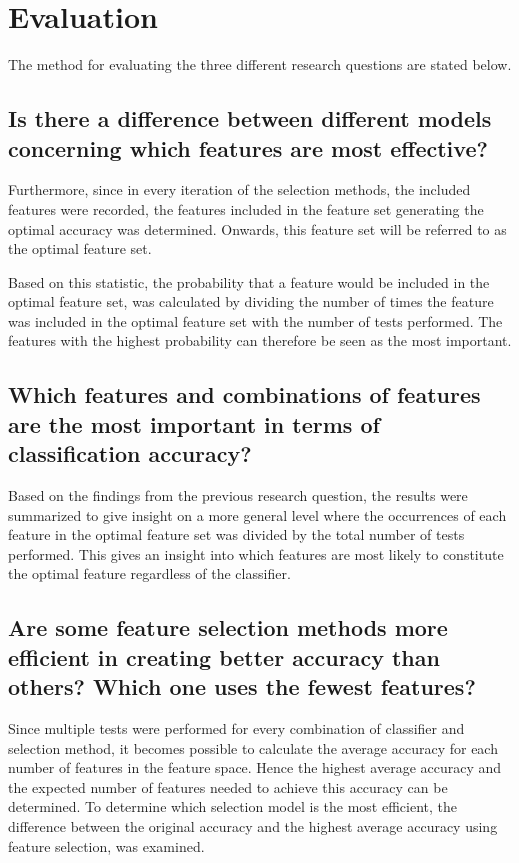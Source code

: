 \documentclass{kththesis}
\begin{document}
\section{Evaluation}

The method for evaluating the three different research questions are stated below.

\subsection{Is there a difference between different models concerning which features are most effective?}
Furthermore, since in every iteration of the selection methods, the included features were recorded, the features included in the feature set generating the optimal accuracy was determined. Onwards, this feature set will be referred to as the optimal feature set. 

Based on this statistic, the probability that a feature would be included in the optimal feature set, was calculated by dividing the number of times the feature was included in the optimal feature set with the number of tests performed. The features with the highest probability can therefore be seen as the most important.

\subsection{Which features and combinations of features are the most important in terms of classification accuracy?}
Based on the findings from the previous research question, the results were summarized to give insight on a more general level where the occurrences of each feature in the optimal feature set was divided by the total number of tests performed. This gives an insight into which features are most likely to constitute the optimal feature regardless of the classifier.

\subsection{Are some feature selection methods more efficient in creating better accuracy than others? Which one uses the fewest features?}
Since multiple tests were performed for every combination of classifier and selection method, it becomes possible to calculate the average accuracy for each number of features in the feature space. Hence the highest average accuracy and the expected number of features needed to achieve this accuracy can be determined. To determine which selection model is the most efficient, the difference between the original accuracy and the highest average accuracy using feature selection, was examined.
\end{document}
